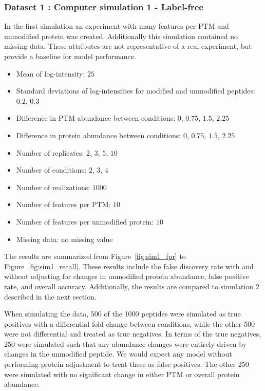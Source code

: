 \documentclass{mcp}
\def\sfigref#1{{Figure~\ref{#1}}}
\begin{document}
\subsubsection{Dataset 1 : Computer simulation 1 - Label-free}

In the first simulation an experiment with many features per PTM and unmodified protein was created. Additionally this simulation contained no missing data. These attributes are not representative of a real experiment, but provide a baseline for model performance.

\begin{itemize}
\item Mean of log-intensity: $25$
\item Standard deviations of log-intensities for modified and unmodified peptides: $0.2$, $0.3$
\item Difference in PTM abundance between conditions: $0$, $0.75$, $1.5$, $2.25$
\item Difference in protein abundance between conditions: $0$, $0.75$, $1.5$, $2.25$
\item Number of replicates: $2$, $3$, $5$, $10$
\item Number of conditions: $2$, $3$, $4$
\item Number of realizations: $1000$
\item Number of features per PTM: $10$
\item Number of features per unmodified protein: $10$
\item Missing data: no missing value
\end{itemize}

The results are summarized from \sfigref{fig:sim1_fpr} to \sfigref{fig:sim1_recall}. These results include the false discovery rate with and without adjusting for changes in unmodified protein abundance, false positive rate, and overall accuracy. Additionally, the results are compared to simulation 2 described in the next section.

When simulating the data, 500 of the 1000 peptides were simulated as true positives with a differential fold change between conditions, while the other 500 were not differential and treated as true negatives. In terms of the true negatives, 250 were simulated such that any abundance changes were entirely driven by changes in the unmodified peptide. We would expect any model without performing protein adjustment to treat these as false positives. The other 250 were simulated with no significant change in either PTM or overall protein abundance.
\end{document}
